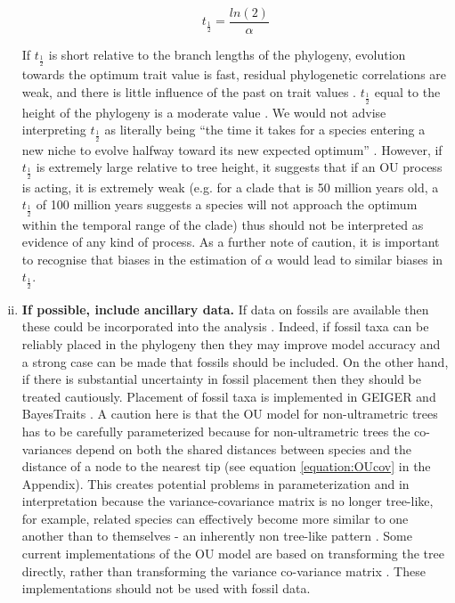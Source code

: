 \documentclass[a4paper,12pt]{article}
\begin{document}
\begin{enumerate}[(i)]
      \begin{equation}
        t_\frac{1}{2} = \frac{ln(2)}{\alpha}
        \label{equation:halflife}
      \end{equation}
    
    \noindent
    If $t_\frac{1}{2}$ is short relative to the branch lengths of the phylogeny, evolution towards the optimum trait value is fast, residual phylogenetic correlations are weak, and there is little influence of the past on trait values \citep{hansen1997stabilizing}.
    $t_\frac{1}{2}$ equal to the height of the phylogeny is a moderate value \citep{hansen2012interpreting}.
    We would not advise interpreting $t_\frac{1}{2}$ as literally being ``the time it takes for a species entering a new niche to evolve halfway toward its new expected optimum'' \citep{hansen1997stabilizing}.
    However, if $t_\frac{1}{2}$ is extremely large relative to tree height, it suggests that if an OU process is acting, it is extremely weak (e.g. for a clade that is 50 million years old, a $t_\frac{1}{2}$ of 100 million years suggests a species will not approach the optimum within the temporal range of the clade) thus should not be interpreted as evidence of any kind of process. 
    As a further note of caution, it is important to recognise that biases in the estimation of $\alpha$ would lead to similar biases in $t_\frac{1}{2}$.
  
    \item \textbf{If possible, include ancillary data.}
    If data on fossils are available then these could be incorporated into the analysis \citep{Slater:2012ab}.
    Indeed, if fossil taxa can be reliably placed in the phylogeny then they may improve model accuracy and a strong case can be made that fossils should be included. 
    On the other hand, if there is substantial uncertainty in fossil placement then they should be treated cautiously. Placement of fossil taxa is implemented in GEIGER \citep{Harmon:2008aa} and BayesTraits \citep{pagel2013bayestraits}.
    A caution here is that the OU model for non-ultrametric trees has to be carefully parameterized because for non-ultrametric trees the co-variances depend on both the shared distances between species and the distance of a node to the nearest tip (see equation \ref{equation:OUcov} in the Appendix). 
    This creates potential problems in parameterization and in interpretation because the variance-covariance matrix is no longer tree-like, for example, related species can effectively become more similar to one another than to themselves - an inherently non tree-like pattern \citep{slater2014correction}.
    Some current implementations of the OU model are based on transforming the tree directly, rather than transforming the variance co-variance matrix \citep[e.g., MOTMOT;][]{Thomas:2011aa}. 
    These implementations should not be used with fossil data.
   \end{enumerate}  
    
\end{document}
